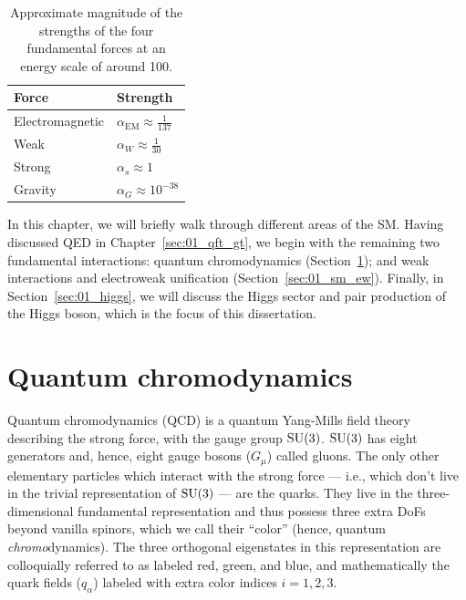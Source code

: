 \begin{table}[htbp]
    \centering
	\renewcommand{\arraystretch}{1.5}
    \begin{tabular}{ll}
        \toprule
        \textbf{Force} & \textbf{Strength}\\
        \midrule
        Electromagnetic &
        $\alpha_{\mathrm{EM}} \approx \frac{1}{137}$ \\
        Weak &
        $\alpha_W \approx \frac{1}{30}$\\
        Strong &
        $\alpha_s \approx 1$\\
        Gravity &
        $\alpha_G  \approx 10^{-38}$\\
        \bottomrule
    \end{tabular}
	\vspace{5mm}
	\caption{Approximate magnitude of the strengths of the four fundamental forces at an energy scale of around 100\MeV.}
	\label{tab:01_sm_coupling_constants}
\end{table}

In this chapter, we will briefly walk through different areas of the SM.
Having discussed QED in Chapter~\ref{sec:01_qft_gt}, we begin with the remaining two fundamental interactions: quantum chromodynamics (Section~\ref{sec:01_sm_qcd}); and weak interactions and electroweak unification (Section~\ref{sec:01_sm_ew}).
Finally, in Section~\ref{sec:01_higgs}, we will discuss the Higgs sector and pair production of the Higgs boson, which is the focus of this dissertation.


\section{Quantum chromodynamics}
\label{sec:01_sm_qcd}

Quantum chromodynamics (QCD) is a quantum Yang-Mills field theory describing the strong force, with the gauge group $\SU[3]$.
$\SU[3]$ has eight generators and, hence, eight gauge bosons ($G_\mu$) called gluons.
The only other elementary particles which interact with the strong force --- i.e., which don't live in the trivial representation of $\SU[3]$ --- are the quarks.
They live in the three-dimensional fundamental representation and thus possess three extra DoFs beyond vanilla spinors, which we call their ``color'' (hence, quantum \textit{chromo}dynamics).
The three orthogonal eigenstates in this representation are colloquially referred to as labeled red, green, and blue, and mathematically the quark fields ($q_\alpha$) labeled with extra color indices $i = 1, 2, 3$.

